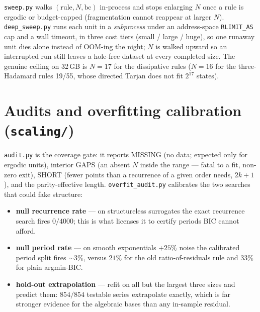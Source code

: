 \documentclass[11pt]{article}
\newcommand{\pf}[1]{\texttt{#1}}          %
\newcommand{\fn}[1]{\texttt{#1}}          %
\begin{document}
\pf{sweep.py} walks $(\text{rule},N,\text{bc})$ in-process and stops enlarging
$N$ once a rule is ergodic or budget-capped (fragmentation cannot reappear at
larger $N$). \pf{deep\_sweep.py} runs each unit in a \emph{subprocess} under an
address-space \fn{RLIMIT\_AS} cap and a wall timeout, in three cost tiers
(small / large / huge), so one runaway unit dies alone instead of OOM-ing the
night; $N$ is walked upward so an interrupted run still leaves a hole-free
dataset at every completed size. The genuine ceiling on 32\,GB is $N=17$ for the
dissipative rules ($N=16$ for the three-Hadamard rules 19/55, whose directed
Tarjan does not fit $2^{17}$ states).

\section{Audits and overfitting calibration (\pf{scaling/})}
\label{sec:overfit}
\fn{audit.py} is the coverage gate: it reports MISSING (no data; expected only
for ergodic units), interior GAPS (an absent $N$ inside the range --- fatal to a
fit, non-zero exit), SHORT (fewer points than a recurrence of a given order
needs, $2k{+}1$), and the parity-effective length. \fn{overfit\_audit.py}
calibrates the two searches that could fake structure:
\begin{itemize}
\item \textbf{null recurrence rate} --- on structureless surrogates the exact
  recurrence search fires $0/4000$; this is what licenses it to certify periods
  BIC cannot afford.
\item \textbf{null period rate} --- on smooth exponentials $+25\%$ noise the
  calibrated period split fires $\sim3\%$, versus $21\%$ for the old
  ratio-of-residuals rule and $33\%$ for plain argmin-BIC.
\item \textbf{hold-out extrapolation} --- refit on all but the largest three
  sizes and predict them: $854/854$ testable series extrapolate exactly, which is
  far stronger evidence for the algebraic bases than any in-sample residual.
\end{itemize}

\end{document}
